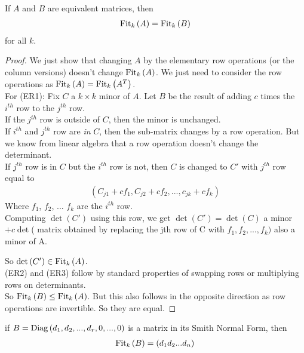 \documentclass[a4paper]{article}
\begin{document}
\begin{lemma}
If $A$ and $B$ are equivalent matrices, then
\begin{equation*}
\begin{aligned}
\operatorname{Fit}_k\left(A\right) = \operatorname{Fit}_k\left(B\right)
\end{aligned}
\end{equation*}
for all $k$.

\begin{proof}
We just show that changing $A$ by the elementary row operations (or the column versions) doesn't change $\operatorname{Fit}_k\left(A\right)$. We just need to consider the row operations as $\operatorname{Fit}_k\left(A\right) = \operatorname{Fit}_k\left(A^T\right)$.\\
For (ER1): Fix $C$ a $k\times k$ minor of $A$. Let $B$ be the result of adding $c$ times the $i^{th}$ row to the $j^{th}$ row.\\
If the $j^{th}$ row is outside of $C$, then the minor is unchanged.\\
If $i^{th}$ and $j^{th}$ row are \emph{in} $C$, then the sub-matrix changes by a row operation. But we know from linear algebra that a row operation doesn't change the determinant.\\
If $j^{th}$ row is in $C$ but the $i^{th}$ row is not, then $C$ is changed to $C'$ with $j^{th}$ row equal to
\begin{equation*}
\begin{aligned}
\left(C_{j1} + cf_1, C_{j2} + cf_2, ... , c_{jk} + cf_k\right)
\end{aligned}
\end{equation*}
Where $f_1$, $f_2$, ... $f_k$ are the $i^{th}$ row.\\
Computing $\det\left(C'\right)$ using this row, we get $\det \left( C' \right) = \det\left(C\right) $ a minor $ + c \det $(  matrix obtained by replacing the jth row of C with $ f_1, f_2,...,f_k)$ also a minor of A.

So $\det \left(C'\right) \in \operatorname{Fit}_k\left(A\right)$.\\
(ER2) and (ER3) follow by standard properties of swapping rows or multiplying rows on determinants.\\
So $\operatorname{Fit}_k\left(B\right) \leq \operatorname{Fit}_k\left(A\right)$. But this also follows in the opposite direction as row operations are invertible. So they are equal.
\end{proof}
\end{lemma}

\begin{rem}
if $B=\operatorname{Diag}\left(d_1,d_2,...,d_r,0,...,0\right)$ is a matrix in its Smith Normal Form, then
\begin{equation*}
\begin{aligned}
\operatorname{Fit}_k \left(B\right) = \left(d_1 d_2 ... d_n\right)
\end{aligned}
\end{equation*}
\end{rem}
\end{document}
